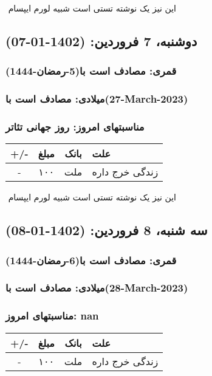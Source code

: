 \documentclass{article}
\newcommand{\rnote}[1]{\marginpar{\textcolor{color}{\StrSubstitute{\##1}{ }{\_}}}}
\newcommand{\myRow}[4]{
    #1 & #2 & #3 & #4 \\ \hline
}
\begin{document}
‌
\rnote{تست}
این نیز یک نوشته تستی است شبیه لورم ایپسام




\newpage
{}
\textcolor{color}{
\section{ دوشنبه، 7 فروردین: (1402-01-07) }
\subsubsection*{قمری: مصادف است با(5-رمضان-1444)} 
\subsubsection*{میلادی: مصادف است با(27-March-2023)}
\subsubsection*{مناسبتهای امروز: روز جهانی تئاتر}
}


\begin{tabular}{ | c | c | c | p{5cm} |}
    \hline
    \myRow{ +/- }{مبلغ}{بانک}{علت}
    \myRow{-}{۱۰۰}{ملت}{زندگی خرج داره}
\end{tabular}
\newline
\newline

‌
\rnote{تست}
این نیز یک نوشته تستی است شبیه لورم ایپسام




\newpage
{}
\textcolor{color}{
\section{ سه شنبه، 8 فروردین: (1402-01-08) }
\subsubsection*{قمری: مصادف است با(6-رمضان-1444)} 
\subsubsection*{میلادی: مصادف است با(28-March-2023)}
\subsubsection*{مناسبتهای امروز: nan}
}


\begin{tabular}{ | c | c | c | p{5cm} |}
    \hline
    \myRow{ +/- }{مبلغ}{بانک}{علت}
    \myRow{-}{۱۰۰}{ملت}{زندگی خرج داره}
\end{tabular}
\newline
\newline
\end{document}
